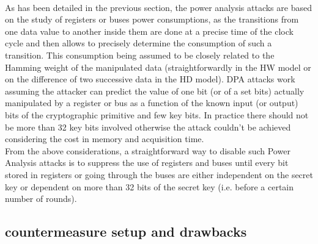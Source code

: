 \documentclass[11pt,a4paper]{article}
\begin{document}
{{{{{{\paragraph{}
As has been detailed in the previous section, the power analysis attacks are based on the study of registers or buses power consumptions, as the transitions from one data value to another inside 
them are done at a precise time of the clock cycle and then allows to precisely determine the consumption of such a transition. This consumption being assumed to be closely related to the 
Hamming weight of the manipulated data (straightforwardly in the HW model or on the difference of two successive data in the HD model). DPA attacks work assuming the attacker can predict 
the value of one bit (or of a set bits) actually manipulated by a register or bus as a function of the known input (or output) bits of the cryptographic primitive and few key bits. In practice 
there should not be more than 32 key bits involved \cite{AkkarGoubin03, AkkarBevanGoubin04, JiqiangLvYongfei05} otherwise the attack couldn't be achieved considering the cost in memory 
and acquisition time.  \\
From the above considerations, a straightforward way to disable such Power Analysis attacks is to suppress the use of registers and buses until every bit stored in registers or going 
through the buses are either independent on the secret key or dependent on more than 32 bits of the secret key (i.e. before a certain number of rounds).
\subsection{countermeasure setup and drawbacks}
}}}}}}
\end{document}
